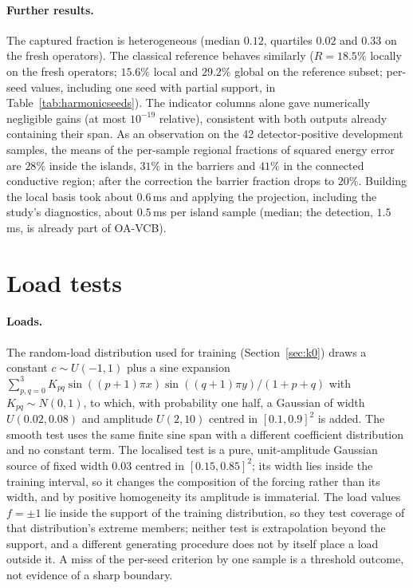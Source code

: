 \paragraph{Further results.} The captured fraction is heterogeneous (median $0.12$, quartiles $0.02$ and $0.33$ on the fresh
operators). The classical reference behaves similarly ($R = 18.5\%$ locally on the fresh operators; $15.6\%$ local and $29.2\%$
global on the reference subset; per-seed values, including one seed with partial support, in Table~\ref{tab:harmonicseeds}). The
indicator columns alone gave numerically negligible gains (at most $10^{-19}$ relative), consistent with both outputs already
containing their span. As an observation on the 42 detector-positive development samples, the means of the per-sample regional
fractions of squared energy error are $28\%$ inside the islands, $31\%$ in the barriers and $41\%$ in the connected conductive
region; after the correction the barrier fraction drops to $20\%$. Building the local basis took about $0.6$\,ms and applying the
projection, including the study's diagnostics, about $0.5$\,ms per island sample (median; the detection, $1.5$\,ms, is already
part of OA-VCB).


\section{Load tests}\label{app:loads}
\paragraph{Loads.} The random-load distribution used for training (Section~\ref{sec:k0}) draws a constant $c\sim U(-1,1)$ plus a
sine expansion $\sum_{p,q=0}^{3}K_{pq}\sin((p+1)\pi x)\sin((q+1)\pi y)/(1+p+q)$ with $K_{pq}\sim N(0,1)$, to which, with
probability one half, a Gaussian of width $U(0.02,0.08)$ and amplitude $U(2,10)$ centred in $[0.1,0.9]^2$ is added. The smooth
test uses the same finite sine span with a different coefficient distribution and no constant term. The localised test is a
pure, unit-amplitude Gaussian source of fixed width $0.03$ centred in $[0.15,0.85]^2$; its width lies inside the training
interval, so it changes the composition of the forcing rather than its width, and by positive homogeneity its amplitude is
immaterial. The load values $f=\pm1$ lie inside the support of the training distribution, so they test coverage of that
distribution's extreme members; neither test is extrapolation beyond the support, and a different generating procedure does not
by itself place a load outside it. A miss of the per-seed criterion by one sample is a threshold outcome, not evidence of a sharp
boundary.



